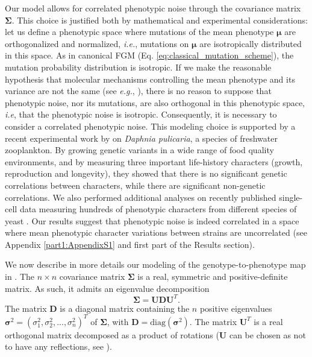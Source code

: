 Our model allows for correlated phenotypic noise through the covariance matrix $\boldsymbol{\Sigma}$. This choice is justified both by mathematical and experimental considerations: let us define a phenotypic space where mutations of the mean phenotype $\boldsymbol{\mu}$ are orthogonalized and normalized, \textit{i.e.}, mutations on $\boldsymbol{\mu}$ are isotropically distributed in this space. As in canonical FGM (Eq. \ref{eq:classical_mutation_scheme}), the mutation probability distribution is isotropic.
If we make the reasonable hypothesis that molecular mechanisms controlling the mean phenotype and its variance are not the same (see \textit{e.g.}, \citealt{vinuelas-et-al-2012}), there is no reason to suppose that phenotypic noise, nor its mutations, are also orthogonal in this phenotypic space, \textit{i.e}, that the phenotypic noise is isotropic. Consequently, it is necessary to consider a correlated phenotypic noise. This modeling choice is supported by a recent experimental work by \cite{cressler-et-al-2017} on \textit{Daphnia pulicaria}, a species of freshwater zooplankton. By growing genetic variants in a wide range of food quality environments, and by measuring three important life-history characters (growth, reproduction and longevity), they showed that there is no significant genetic correlations between characters, while there are significant non-genetic correlations. We also performed additional analyses on recently published single-cell data measuring hundreds of phenotypic characters from different species of yeast \citep{yvert-et-al-2013}. Our results suggest that phenotypic noise is indeed correlated in a space where mean phenotypic character variations between strains are uncorrelated (see Appendix \ref{part1:AppendixS1} and first part of the Results section).

We now describe in more details our modeling of the genotype-to-phenotype map in {\sigmaFGM}.
The $n \times n$ covariance matrix $\boldsymbol{\Sigma}$ is a real, symmetric and positive-definite matrix. As such, it admits an eigenvalue decomposition
\begin{equation}
\boldsymbol{\Sigma} = \boldsymbol{U} \boldsymbol{D} \boldsymbol{U}^T.
\label{eq:decomposition}
\end{equation}
The matrix $\boldsymbol{D}$ is a diagonal matrix containing the $n$ positive eigenvalues $\boldsymbol{\sigma}^2 = (\sigma^2_1,\sigma^2_2,...,\sigma^2_n)^T$ of $\boldsymbol{\Sigma}$, with $\boldsymbol{D} = \mathrm{diag}(\boldsymbol{\sigma}^2)$. The matrix $\boldsymbol{U}^T$ is a real orthogonal matrix decomposed as a product of rotations ($\boldsymbol{U}$ can be chosen as not to have any reflections, see \citealt{anderson-et-al-1987}).

